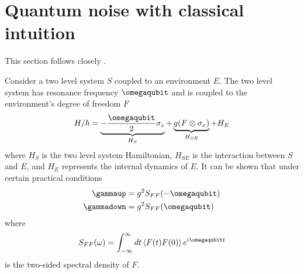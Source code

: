\section{Quantum noise with classical intuition}

This section follows closely \cite{Sank:decoherence:2015}.

Consider a two level system $S$ coupled to an environment $E$.
The two level system has resonance frequency $\omegaqubit$ and is coupled to the environment's degree of freedom $F$
\begin{equation}
  H/\hbar = \underbrace{- \frac{\omegaqubit}{2} \sigma_z}_{H_S} + \underbrace{g (F \otimes \sigma_x)}_{H_{SE}} + H_E \label{eq:noise_hamiltonian}
\end{equation}
where $H_S$ is the two level system Hamiltonian, $H_{SE}$ is the interaction between $S$ and $E$, and $H_E$ represents the internal dynamics of $E$.
It can be shown that under certain practical conditions
\begin{align}
    \gammaup &= g^2 S_{FF}(-\omegaqubit) \label{eq:gamma_up} \\
    \gammadown &= g^2 S_{FF}(\omegaqubit) \label{eq:gamma_down}
\end{align}
where
\begin{equation}
  S_{FF}(\omega) = \int_{-\infty}^\infty dt \, \langle F(t) F(0) \rangle \, e^{i \omegaqubit t}
\end{equation}
is the two-sided spectral density of $F$.


